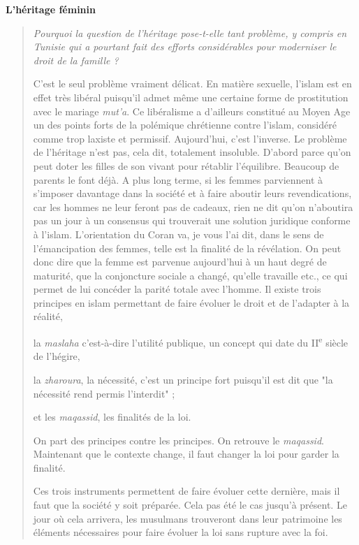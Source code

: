 \textbf{L'héritage féminin}
\begin{quote}
    \emph{Pourquoi la question de l'héritage pose-t-elle tant problème, y
compris en Tunisie qui a pourtant fait des efforts considérables pour
moderniser le droit de la famille ?}

C'est le seul problème vraiment délicat. En matière sexuelle, l'islam
est en effet très libéral puisqu'il admet même une certaine forme de
prostitution avec le mariage \emph{mut'a}. Ce libéralisme a d'ailleurs
constitué au Moyen Age un des points forts de la polémique chrétienne
contre l'islam, considéré comme trop laxiste et permissif. Aujourd'hui,
c'est l'inverse. Le problème de l'héritage n'est pas, cela dit,
totalement insoluble. D'abord parce qu'on peut doter les filles de son
vivant pour rétablir l'équilibre. Beaucoup de parents le font déjà. A
plus long terme, si les femmes parviennent à s'imposer davantage dans la
société et à faire aboutir leurs revendications, car les hommes ne leur
feront pas de cadeaux, rien ne dit qu'on n'aboutira pas un jour à un
consensus qui trouverait une solution juridique conforme à l'islam.
L'orientation du Coran va, je vous l'ai dit, dans le sens de
l'émancipation des femmes, telle est la finalité de la révélation. On
peut donc dire que la femme est parvenue aujourd'hui à un haut degré de
maturité, que la conjoncture sociale a changé, qu'elle travaille etc.,
ce qui permet de lui concéder la parité totale avec l'homme. Il existe
trois principes en islam permettant de faire évoluer le droit et de
l'adapter
à la réalité, 

la \emph{maslaha} c'est-à-dire l'utilité publique, un
concept qui date du II\textsuperscript{e} siècle de l'hégire, 

la
\emph{zharoura}, la nécessité, c'est un principe fort puisqu'il est dit
que "la nécessité rend permis l'interdit" ; 

et les \emph{maqassid}, les
finalités de la loi.  \label{TroisPrincipesEvolutionsShariA}

\begin{Synthesis}
On part des principes contre les principes. On retrouve le \textit{maqassid}. Maintenant que le contexte change, il faut changer la loi pour garder la finalité.
\end{Synthesis}

Ces trois instruments permettent de faire évoluer
cette dernière, mais il faut que la société y soit préparée. Cela pas
été le cas jusqu'à présent. Le jour où cela arrivera, les musulmans
trouveront dans leur patrimoine les éléments nécessaires pour faire
évoluer la loi sans rupture avec la foi.
\end{quote}

 

